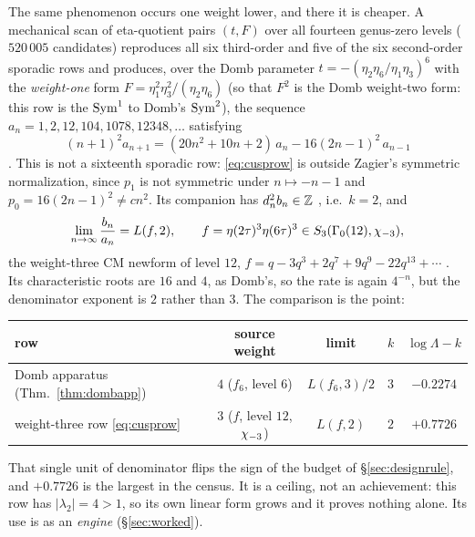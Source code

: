 The same phenomenon occurs one weight lower, and there it is cheaper.  A
mechanical scan of eta-quotient pairs $(t,F)$ over all fourteen genus-zero
levels ($520\,005$ candidates) reproduces all six third-order and five of the
six second-order sporadic rows and produces, over the Domb parameter
$t=-(\eta_2\eta_6/\eta_1\eta_3)^6$ with the \emph{weight-one} form
$F=\eta_1^2\eta_3^2/(\eta_2\eta_6)$ (so that $F^2$ is the Domb weight-two
form: this row is the $\operatorname{Sym}^1$ to Domb's $\operatorname{Sym}^2$), the sequence
$a_n=1,2,12,104,1078,12348,\dots$ satisfying
\begin{equation}\label{eq:cusprow}
(n+1)^2a_{n+1}=(20n^2+10n+2)\,a_n-16(2n-1)^2\,a_{n-1}
\end{equation}
 \cite{ProjSporadicSearch}.  This is
not a sixteenth sporadic row: \eqref{eq:cusprow} is outside Zagier's
symmetric normalization, since $p_1$ is not symmetric under $n\mapsto-n-1$ and
$p_0=16(2n-1)^2\neq cn^2$.  Its companion has $d_n^2b_n\in\mathbb{Z}$
, i.e.\ $k=2$, and
\begin{equation}\label{eq:cusplimit}
\lim_{n\to\infty}\frac{b_n}{a_n}=L(f,2),\qquad
f=\eta(2\tau)^3\eta(6\tau)^3\in S_3(\Gamma_0(12),\chi_{-3}),
\end{equation}
the weight-three CM newform of level $12$, $f=q-3q^3+2q^7+9q^9-22q^{13}+\cdots$
.  Its characteristic roots are $16$ and $4$,
as Domb's, so the rate is again $4^{-n}$, but the denominator exponent is $2$
rather than $3$.  The comparison is the point:

\begin{center}
\begin{tabular}{@{}l c c c c@{}}
\toprule
row & source weight & limit & $k$ & $\log\Lambda-k$\\
\midrule
Domb apparatus (Thm.~\ref{thm:dombapp}) & $4$ ($f_6$, level $6$) & $L(f_6,3)/2$ & $3$ & $-0.2274$\\
weight-three row \eqref{eq:cusprow} & $3$ ($f$, level $12$, $\chi_{-3}$) & $L(f,2)$ & $2$ & $+0.7726$\\
\bottomrule
\end{tabular}
\end{center}

\noindent
That single unit of denominator flips the sign of the budget of
\S\ref{sec:designrule}, and $+0.7726$ is the largest in the census.  It is a
ceiling, not an achievement: this row has $|\lambda_2|=4>1$, so its own linear
form grows and it proves nothing alone.  Its use is as an \emph{engine}
(\S\ref{sec:worked}).  


